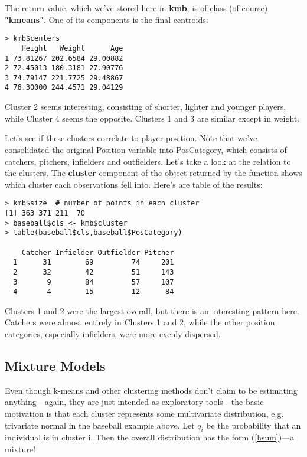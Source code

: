 The return value, which we've stored here in {\bf kmb}, is of class (of
course) {\bf "kmeans"}.  One of its components is the final centroids:

\begin{lstlisting}
> kmb$centers
    Height   Weight      Age
1 73.81267 202.6584 29.00882
2 72.45013 180.3181 27.90776
3 74.79147 221.7725 29.48867
4 76.30000 244.4571 29.04129
\end{lstlisting}

Cluster 2 seems interesting, consisting of shorter, lighter and younger
players, while Cluster 4 seems the opposite.  Clusters 1 and 3 are
similar except in weight.

Let's see if these clusters correlate to player position.  Note that
we've consolidated the original Position variable into PosCategory,
which consists of catchers, pitchers, infielders and outfielders.  Let's
take a look at the relation to the clusters.  The {\bf cluster}
component of the object returned by the function shows which cluster
each observations fell into.  Here's are table of the results:

\begin{lstlisting}
> kmb$size  # number of points in each cluster
[1] 363 371 211  70
> baseball$cls <- kmb$cluster  
> table(baseball$cls,baseball$PosCategory)
   
    Catcher Infielder Outfielder Pitcher
  1      31        69         74     201
  2      32        42         51     143
  3       9        84         57     107
  4       4        15         12      84
\end{lstlisting}

Clusters 1 and 2 were the largest overall, but there is an interesting
pattern here.  Catchers were almost entirely in Clusters 1 and 2, while
the other position categories, especially infielders, were more evenly
dispersed.

\subsection{Mixture Models}
\label{mixclust}

Even though k-means and other clustering methods don't claim to be
estimating anything---again, they are just intended as exploratory
tools---the basic motivation is that each cluster represents some
multivariate distribution, e.g. trivariate normal in the baseball
example above.  Let $q_i$ be the probability that an individual is in
cluster i.  Then the overall distribution has the form (\ref{hsum})---a
mixture!

